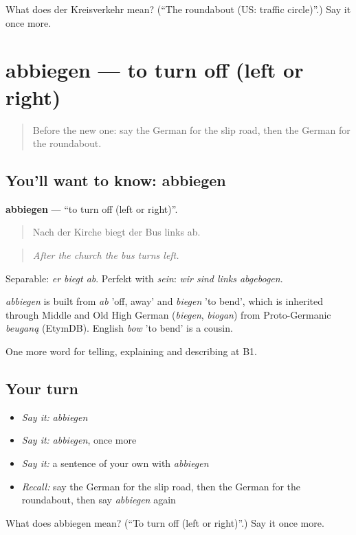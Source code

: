 \begin{tcolorbox}[breakable,colback=teal!4,colframe=teal!35!black,title={Before you move on}]
What does der Kreisverkehr mean? (\textquotedblleft{}The roundabout (US: traffic circle)\textquotedblright{}.) Say it once more.
\end{tcolorbox}
\section[abbiegen]{abbiegen — to turn off (left or right)}

\label{lesson:GE-C398-abbiegen}



\begin{quote}
Before the new one: say the German for the slip road, then the German for the roundabout.
\end{quote}

\subsection*{You'll want to know: abbiegen}
\textbf{abbiegen} — \textquotedblleft{}to turn off (left or right)\textquotedblright{}.

\begin{quote}
Nach der Kirche biegt der Bus links ab.
\end{quote}

\begin{quote}
\emph{After the church the bus turns left.}
\end{quote}

Separable: \emph{er biegt ab}. Perfekt with \emph{sein}: \emph{wir sind links abgebogen}.

\begin{cousinweb}
\emph{abbiegen} is built from \emph{ab} 'off, away' and \emph{biegen} 'to bend', which is inherited through Middle and Old High German (\emph{biegen}, \emph{biogan}) from Proto-Germanic \emph{beuganą} (EtymDB). English \emph{bow} 'to bend' is a cousin.
\end{cousinweb}

\begin{grammarlens}[title={What you've built}]
One more word for telling, explaining and describing at B1.
\end{grammarlens}

\subsection*{Your turn}
\begin{itemize}
\raggedright
  \item \emph{Say it:} \emph{abbiegen}
  \item \emph{Say it:} \emph{abbiegen}, once more
  \item \emph{Say it:} a sentence of your own with \emph{abbiegen}
  \item \emph{Recall:} say the German for the slip road, then the German for the roundabout, then say \emph{abbiegen} again
\end{itemize}

\begin{tcolorbox}[breakable,colback=teal!4,colframe=teal!35!black,title={Before you move on}]
What does abbiegen mean? (\textquotedblleft{}To turn off (left or right)\textquotedblright{}.) Say it once more.
\end{tcolorbox}
